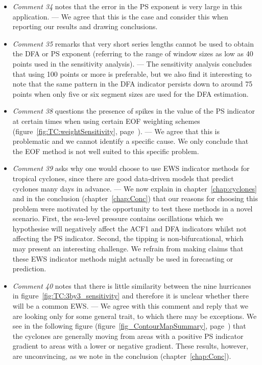 \begin{itemize}
	\item \emph{Comment 34} notes that the error in the PS exponent is very large in this application. — We agree that this is the case and consider this when reporting our results and drawing conclusions.
	\item \emph{Comment 35} remarks that very short series lengths cannot be used to obtain the DFA or PS exponent (referring to the range of window sizes as low as 40 points used in the sensitivity analysis). — The sensitivity analysis concludes that using 100 points or more is preferable, but we also find it interesting to note that the same pattern in the DFA indicator persists down to around 75 points when only five or six segment sizes are used for the DFA estimation.
	\item \emph{Comment 38} questions the presence of spikes in the value of the PS indicator at certain times when using certain EOF weighting schemes (figure~\ref{fig:TC:weightSensitivity}, page~\pageref{fig:TC:weightSensitivity}). — We agree that this is problematic and we cannot identify a specific cause. We only conclude that the EOF method is not well suited to this specific problem. 
	\item \emph{Comment 39} asks why one would choose to use EWS indicator methods for tropical cyclones, since there are good data-driven models that predict cyclones many days in advance. — We now explain in chapter~\ref{chap:cyclones} and in the conclusion (chapter~\ref{chap:Conc}) that our reasons for choosing this problem were motivated by the opportunity to test these methods in a novel scenario. First, the sea-level pressure contains oscillations which we hypothesise will negatively affect the ACF1 and DFA indicators whilst not affecting the PS indicator. Second, the tipping is non-bifurcational, which may present an interesting challenge. We refrain from making claims that these EWS indicator methods might actually be used in forecasting or prediction.
	\item \emph{Comment 40} notes that there is little similarity between the nine hurricanes in figure~\ref{fig:TC:3by3_sensitivity} and therefore it is unclear whether there will be a common EWS. — We agree with this comment and reply that we are looking only for some general trait, to which there may be exceptions. We see in the following figure (figure~\ref{fig_ContourMapSummary}, page~\pageref{fig_ContourMapSummary}) that the cyclones are generally moving from areas with a positive PS indicator gradient to areas with a lower or negative gradient. These results, however, are unconvincing, as we note in the conclusion (chapter~\ref{chap:Conc}). 

\end{itemize}
